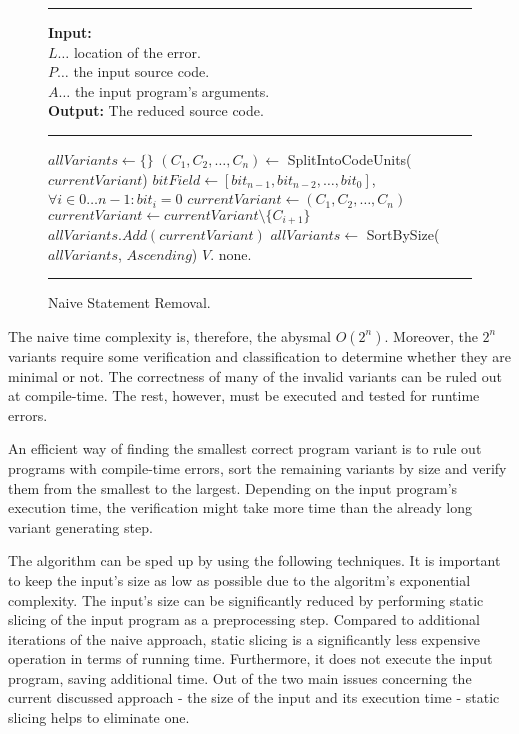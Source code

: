 \begin{figure}[h]
	\hrule height.8pt depth0pt \kern2pt
	\textbf{Input:} \\
	\hspace*{\algorithmicindent} $L \ldots$ location of the error. \\
	\hspace*{\algorithmicindent} $P \ldots$ the input source code. \\
	\hspace*{\algorithmicindent} $A \ldots$ the input program's arguments. \\
	\textbf{Output:} The reduced source code. 
	\hrule height.8pt depth0pt \kern2pt
	\begin{algorithmic}[1]
		\State $allVariants \leftarrow \{\}$
		\State $(C_1, C_2, \ldots, C_n) \leftarrow$ SplitIntoCodeUnits($currentVariant$)
		\State $bitField \leftarrow [{bit}_{n-1}, {bit}_{n-2}, \ldots, {bit}_0]$,  
			$\forall i \in 0 \ldots n-1 : bit_i = 0$
			\State $currentVariant \leftarrow (C_1, C_2, \ldots, C_n)$
					\State $currentVariant \leftarrow currentVariant \setminus \{C_{i+1}\}$
				\EndIf
			\EndFor
			\State $allVariants.Add(currentVariant)$
		\EndWhile
		\State $allVariants \leftarrow$ SortBySize($allVariants$, $Ascending$)
				\Return $V$.
			\EndIf
		\EndFor
		\State \Return none.
	\end{algorithmic} 
	\hrule height.8pt depth0pt \kern2pt
	\caption{Naive Statement Removal.} 
	\label{alg:naive}
\end{figure}

The naive time complexity is, therefore, the abysmal $O(2^n)$.
Moreover, the $2^n$ variants require some verification and classification 
to determine whether they are minimal or not.
The correctness of many of the invalid variants can be ruled out at 
compile-time.
The rest, however, must be executed and tested for runtime errors.

An efficient way of finding the smallest correct program variant is to rule 
out programs with compile-time errors, sort the remaining variants by size 
and verify them from the smallest to the largest.
Depending on the input program's execution time, the verification might take 
more time than the already long variant generating step.

The algorithm can be sped up by using the following techniques.
It is important to keep the input's size as low as possible due to the 
algoritm's exponential complexity.
The input's size can be significantly reduced by performing static 
slicing of the input program as a preprocessing step.
Compared to additional iterations of the naive approach, static slicing is 
a significantly less expensive operation in terms of running time.
Furthermore, it does not execute the input program, saving additional time.
Out of the two main issues concerning the current discussed approach - 
the size of the input and its execution time - static slicing helps 
to eliminate one.

